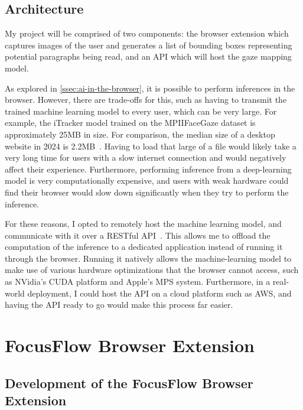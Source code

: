 \documentclass{report}
\begin{document}
\section{Architecture}

My project will be comprised of two components: the browser extension which captures images of the user and generates a list of bounding boxes representing potential paragraphs being read, and an API which will host the gaze mapping model.

As explored in \autoref{ssec:ai-in-the-browser}, it is possible to perform inferences in the browser. However, there are trade-offs for this, such as having to transmit the trained machine learning model to every user, which can be very large. For example, the iTracker model trained on the MPIIFaceGaze dataset is approximately 25MB in size. For comparison, the median size of a desktop website in 2024 is 2.2MB~\cite{httparchive2024pageweight}. Having to load that large of a file would likely take a very long time for users with a slow internet connection and would negatively affect their experience. Furthermore, performing inference from a deep-learning model is very computationally expensive, and users with weak hardware could find their browser would slow down significantly when they try to perform the inference. 

For these reasons, I opted to remotely host the machine learning model, and communicate with it over a RESTful API~\cite{fielding2000phd}. This allows me to offload the computation of the inference to a dedicated application instead of running it through the browser. Running it natively allows the machine-learning model to make use of various hardware optimizations that the browser cannot access, such as NVidia's CUDA platform and Apple's MPS system. Furthermore, in a real-world deployment, I could host the API on a cloud platform such as AWS, and having the API ready to go would make this process far easier. 


\chapter{FocusFlow Browser Extension}
\label{chap:methods}


\section{Development of the FocusFlow Browser Extension}
\end{document}
